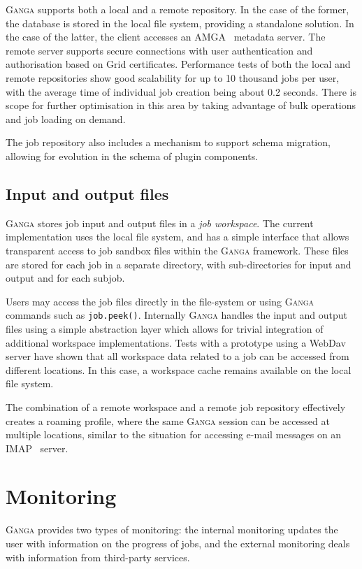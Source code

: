 \documentclass{elsart}
\def\ganga {\textsc{Ganga}\xspace}
\def\grid {Grid\xspace}
\begin{document}
\ganga supports both a local and a remote repository. In the
case of the former, the database is stored in the local file system,
providing a standalone solution. 
In the case of the latter,
the client accesses an AMGA~\cite{AMGA} metadata
server. The remote server supports secure connections with user
authentication and authorisation based on \grid certificates.
Performance tests of both the local and remote repositories show good
scalability for up to 10 thousand jobs per user, with the average time
of individual job creation being about 0.2 seconds. There is scope for
further optimisation in this area by taking advantage of bulk
operations and job loading on demand.

The job repository also includes a mechanism to support schema migration,
allowing for evolution in the schema of plugin components.

\subsection{Input and output files}

\ganga stores job input and output files in a \emph{job workspace}. 
The current implementation uses the local file system, and has a simple
interface that allows transparent access to job sandbox files within the
\ganga framework. These files are stored for each job in a separate
directory, with sub-directories for input and output and for each subjob.

Users may access the job files directly in the file-system or using \ganga commands
such as \texttt{job.peek()}. Internally \ganga handles the input and output
files using a simple abstraction layer which allows for trivial integration
of additional workspace implementations.
Tests with a prototype using a WebDav~\cite{WebDav}
server have shown that all workspace data related to a
job can be accessed from different locations. In this case, a workspace
cache remains available on the local file system.

The combination of a remote workspace and a remote job repository effectively
creates a roaming profile, where the same \ganga session can be accessed at
multiple locations, similar to the situation for accessing e-mail messages
on an IMAP~\cite{IMAP} server.

\section{Monitoring}
\label{sec:mon}
\ganga provides two types of monitoring: the internal monitoring updates
the user with information on the progress of jobs, and the external
monitoring deals with information from third-party services.
\end{document}
